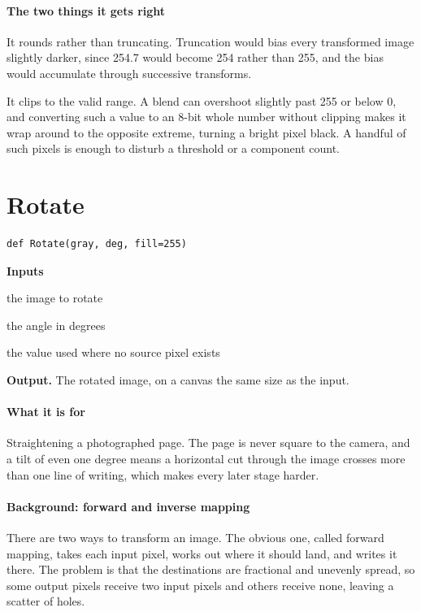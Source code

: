 \paragraph{The two things it gets right}
It rounds rather than truncating. Truncation would bias every transformed image slightly darker, since 254.7 would become 254 rather than 255, and the bias would accumulate through successive transforms.

It clips to the valid range. A blend can overshoot slightly past 255 or below 0, and converting such a value to an 8-bit whole number without clipping makes it wrap around to the opposite extreme, turning a bright pixel black. A handful of such pixels is enough to disturb a threshold or a component count.


\section{Rotate}
\begin{lstlisting}[style=sig]
def Rotate(gray, deg, fill=255)
\end{lstlisting}

\noindent\textbf{Inputs}
\begin{description}[leftmargin=2.2em,style=nextline,font=\normalfont\ttfamily]\setlength\itemsep{1pt}
  \item[{img}] \normalfont the image to rotate
  \item[{deg}] \normalfont the angle in degrees
  \item[{fill}] \normalfont the value used where no source pixel exists
\end{description}

\noindent\textbf{Output.} The rotated image, on a canvas the same size as the input.


\paragraph{What it is for}
Straightening a photographed page. The page is never square to the camera, and a tilt of even one degree means a horizontal cut through the image crosses more than one line of writing, which makes every later stage harder.


\paragraph{Background: forward and inverse mapping}
There are two ways to transform an image. The obvious one, called forward mapping, takes each input pixel, works out where it should land, and writes it there. The problem is that the destinations are fractional and unevenly spread, so some output pixels receive two input pixels and others receive none, leaving a scatter of holes.

